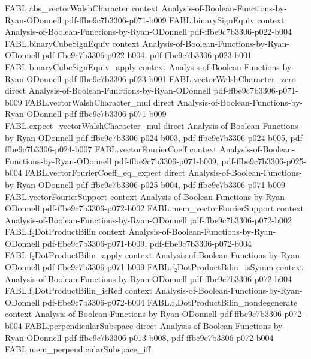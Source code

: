 \begin{theorem}
\proofstep
  {FABL.abs_vectorWalshCharacter}
  {context}
  {Analysis-of-Boolean-Functions-by-Ryan-ODonnell}
  {pdf-ffbe9c7b3306-p071-b009}
\proofstep
  {FABL.binarySignEquiv}
  {context}
  {Analysis-of-Boolean-Functions-by-Ryan-ODonnell}
  {pdf-ffbe9c7b3306-p022-b004}
\proofstep
  {FABL.binaryCubeSignEquiv}
  {context}
  {Analysis-of-Boolean-Functions-by-Ryan-ODonnell}
  {pdf-ffbe9c7b3306-p022-b004,
    pdf-ffbe9c7b3306-p023-b001}
\proofstep
  {FABL.binaryCubeSignEquiv_apply}
  {context}
  {Analysis-of-Boolean-Functions-by-Ryan-ODonnell}
  {pdf-ffbe9c7b3306-p023-b001}
\proofstep
  {FABL.vectorWalshCharacter_zero}
  {direct}
  {Analysis-of-Boolean-Functions-by-Ryan-ODonnell}
  {pdf-ffbe9c7b3306-p071-b009}
\proofstep
  {FABL.vectorWalshCharacter_mul}
  {direct}
  {Analysis-of-Boolean-Functions-by-Ryan-ODonnell}
  {pdf-ffbe9c7b3306-p071-b009}
\proofstep
  {FABL.expect_vectorWalshCharacter_mul}
  {direct}
  {Analysis-of-Boolean-Functions-by-Ryan-ODonnell}
  {pdf-ffbe9c7b3306-p024-b003,
    pdf-ffbe9c7b3306-p024-b005,
    pdf-ffbe9c7b3306-p024-b007}
\proofstep
  {FABL.vectorFourierCoeff}
  {context}
  {Analysis-of-Boolean-Functions-by-Ryan-ODonnell}
  {pdf-ffbe9c7b3306-p071-b009,
    pdf-ffbe9c7b3306-p025-b004}
\proofstep
  {FABL.vectorFourierCoeff_eq_expect}
  {direct}
  {Analysis-of-Boolean-Functions-by-Ryan-ODonnell}
  {pdf-ffbe9c7b3306-p025-b004,
    pdf-ffbe9c7b3306-p071-b009}
\proofstep
  {FABL.vectorFourierSupport}
  {context}
  {Analysis-of-Boolean-Functions-by-Ryan-ODonnell}
  {pdf-ffbe9c7b3306-p072-b002}
\proofstep
  {FABL.mem_vectorFourierSupport}
  {context}
  {Analysis-of-Boolean-Functions-by-Ryan-ODonnell}
  {pdf-ffbe9c7b3306-p072-b002}
\proofstep
  {FABL.f₂DotProductBilin}
  {context}
  {Analysis-of-Boolean-Functions-by-Ryan-ODonnell}
  {pdf-ffbe9c7b3306-p071-b009,
    pdf-ffbe9c7b3306-p072-b004}
\proofstep
  {FABL.f₂DotProductBilin_apply}
  {context}
  {Analysis-of-Boolean-Functions-by-Ryan-ODonnell}
  {pdf-ffbe9c7b3306-p071-b009}
\proofstep
  {FABL.f₂DotProductBilin_isSymm}
  {context}
  {Analysis-of-Boolean-Functions-by-Ryan-ODonnell}
  {pdf-ffbe9c7b3306-p072-b004}
\proofstep
  {FABL.f₂DotProductBilin_isRefl}
  {context}
  {Analysis-of-Boolean-Functions-by-Ryan-ODonnell}
  {pdf-ffbe9c7b3306-p072-b004}
\proofstep
  {FABL.f₂DotProductBilin_nondegenerate}
  {context}
  {Analysis-of-Boolean-Functions-by-Ryan-ODonnell}
  {pdf-ffbe9c7b3306-p072-b004}
\proofstep
  {FABL.perpendicularSubspace}
  {direct}
  {Analysis-of-Boolean-Functions-by-Ryan-ODonnell}
  {pdf-ffbe9c7b3306-p013-b008,
    pdf-ffbe9c7b3306-p072-b004}
\proofstep
  {FABL.mem_perpendicularSubspace_iff}

\end{theorem}
